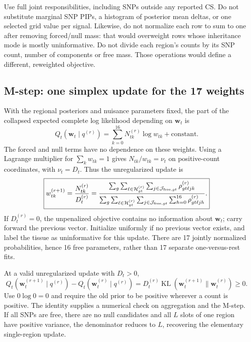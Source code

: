 \documentclass[11pt]{article}
\newcommand{\KL}{\operatorname{KL}}
\begin{document}
Use full joint responsibilities, including SNPs outside any reported CS.
Do not substitute marginal SNP PIPs, a histogram of posterior mean deltas,
or one selected grid value per signal. Likewise, do not normalize each row
to sum to one after removing forced/null mass: that would overweight rows
whose inheritance mode is mostly uninformative. Do not divide each region's
counts by its SNP count, number of components or free mass. Those operations
would define a different, reweighted objective.

\subsection{M-step: one simplex update for the 17 weights}
With the regional posteriors and nuisance parameters fixed, the part of
the collapsed expected complete log likelihood depending on $\mathbf w_t$
is
\begin{equation}
 Q_t(\mathbf w_t\mid q^{(r)})
 =\sum_{k=0}^{16}N_{tk}^{(r)}\log w_{tk}+\mathrm{constant}.
 \label{eq:Q}
\end{equation}
The forced and null terms have no dependence on these weights.
Using a Lagrange multiplier for $\sum_kw_{tk}=1$ gives
$N_{tk}/w_{tk}=\nu_t$ on positive-count coordinates, with $\nu_t=D_t$.
Thus the unregularized update is
\begin{equation}
 \boxed{\displaystyle
 w_{tk}^{(r+1)}
 =\frac{N_{tk}^{(r)}}{D_t^{(r)}}
 =\frac{\sum_g\sum_{\ell\in\mathcal H_{gt}^{(r)}}
                   \sum_{j\in\mathcal J_{{\rm free},gt}}
                        \rho_{gt\ell jk}^{(r)}}
        {\sum_g\sum_{\ell\in\mathcal H_{gt}^{(r)}}
                   \sum_{j\in\mathcal J_{{\rm free},gt}}
                        \sum_{h=0}^{16}\rho_{gt\ell jh}^{(r)}}.}
 \label{eq:wupdate}
\end{equation}
If $D_t^{(r)}=0$, the unpenalized objective contains no information about
$\mathbf w_t$; carry forward the previous vector. Initialize uniformly if
no previous vector exists, and label the tissue as uninformative for this
update. There are 17 jointly normalized probabilities, hence 16 free
parameters, rather than 17 separate one-versus-rest fits.

At a valid unregularized update with $D_t>0$,
\begin{equation}
 Q_t(\mathbf w_t^{(r+1)}\mid q^{(r)})
 -Q_t(\mathbf w_t^{(r)}\mid q^{(r)})
 =D_t^{(r)}\KL(\mathbf w_t^{(r+1)}\|
                         \mathbf w_t^{(r)})\geq0.
 \label{eq:tissue-qgain}
\end{equation}
Use $0\log0=0$ and require the old prior to be positive wherever a count is
positive. The identity supplies a numerical check on aggregation and the
M-step. If all SNPs are free, there are no null candidates and all $L$ slots
of one region have positive variance, the denominator reduces to $L$,
recovering the elementary single-region update.
\end{document}

